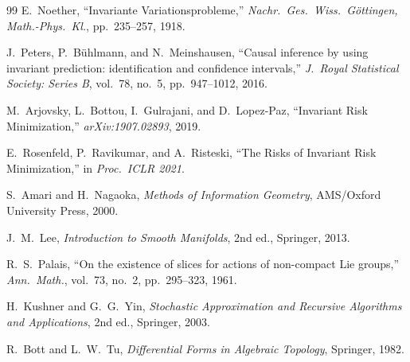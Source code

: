 \documentclass[11pt,a4paper]{article}
\begin{document}
\begin{thebibliography}{99}
E.\ Noether, ``Invariante Variationsprobleme,'' \textit{Nachr.\ Ges.\ Wiss.\ Göttingen, Math.-Phys.\ Kl.}, pp.\ 235--257, 1918.

J.\ Peters, P.\ Bühlmann, and N.\ Meinshausen, ``Causal inference by using invariant prediction: identification and confidence intervals,'' \textit{J.\ Royal Statistical Society: Series B}, vol.\ 78, no.\ 5, pp.\ 947--1012, 2016.

M.\ Arjovsky, L.\ Bottou, I.\ Gulrajani, and D.\ Lopez-Paz, ``Invariant Risk Minimization,'' \textit{arXiv:1907.02893}, 2019.

E.\ Rosenfeld, P.\ Ravikumar, and A.\ Risteski, ``The Risks of Invariant Risk Minimization,'' in \textit{Proc.\ ICLR 2021}.

S.\ Amari and H.\ Nagaoka, \textit{Methods of Information Geometry}, AMS/Oxford University Press, 2000.

J.\ M.\ Lee, \textit{Introduction to Smooth Manifolds}, 2nd ed., Springer, 2013.

R.\ S.\ Palais, ``On the existence of slices for actions of non-compact Lie groups,'' \textit{Ann.\ Math.}, vol.\ 73, no.\ 2, pp.\ 295--323, 1961.

H.\ Kushner and G.\ G.\ Yin, \textit{Stochastic Approximation and Recursive Algorithms and Applications}, 2nd ed., Springer, 2003.

R.\ Bott and L.\ W.\ Tu, \textit{Differential Forms in Algebraic Topology}, Springer, 1982.
\end{thebibliography}
\end{document}
